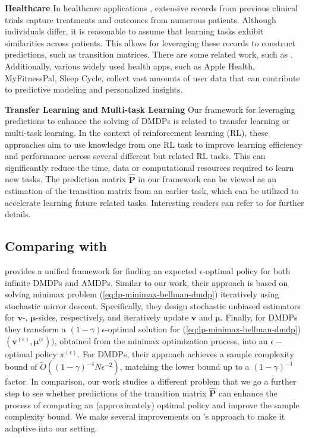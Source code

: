 \documentclass[12pt]{article}
\begin{document}
\textbf{Healthcare} In healthcare applications \cite{yu2021reinforcement}, extensive records from previous clinical trials capture treatments and outcomes from numerous patients. Although individuals differ, it is reasonable to assume that learning tasks exhibit similarities across patients. This allows for leveraging these records to construct predictions, such as transition matrices. There are some related work, such as \cite{chen2022data,mate2022field,liao2020personalized}. Additionally, various widely used health apps, such as Apple Health, MyFitnessPal, Sleep Cycle, collect vast amounts of user data that can contribute to predictive modeling and personalized insights.

\textbf{Transfer Learning and Multi-task Learning} Our framework for leveraging predictions to enhance the solving of DMDPs is related to transfer learning or multi-task learning. In the context of reinforcement learning (RL), these approaches aim to use knowledge from one RL task to improve learning efficiency and performance across several different but related RL tasks. This can significantly reduce the time, data or computational resources required to learn new tasks. The prediction matrix $\hat{\boldsymbol{\text{P}}}$ in our framework can be viewed as an estimation of the transition matrix from an earlier task, which can be utilized to accelerate learning future related tasks. Interesting readers can refer to \cite{taylor2009transfer,zhu2023transfer,hua2021learning,gamrian2019transfer} for further details.

\subsection{Comparing with \cite{jin2020efficiently}}

\label{sec:app-com-sidford-efficient}

\cite{jin2020efficiently} provides a unified framework for finding an expected $\epsilon$-optimal policy for both infinite DMDPs and AMDPs. Similar to our work, their approach is based on solving minimax problem (\ref{eq:lp-minimax-bellman-dmdp}) iteratively using stochastic mirror descent. Specifically, they design stochastic unbiased estimators for $\boldsymbol{v}$-, $\boldsymbol{\mu}$-sides, respectively, and iteratively update $\boldsymbol{v}$ and $\boldsymbol{\mu}$. Finally, for DMDPs they transform a $(1-\gamma) \epsilon$-optimal solution for (\ref{eq:lp-minimax-bellman-dmdp}) $(\boldsymbol{v}^{(\epsilon)},\boldsymbol{\mu}^{(\epsilon}))$, obtained from the minimax optimization process, into an $\epsilon-$optimal policy $\pi^{(\epsilon)}$. For DMDPs, their approach achieves a sample complexity bound of $\tilde{O}((1-\gamma)^{-4}N\epsilon^{-2})$, matching the lower bound up to a $(1-\gamma)^{-1}$ factor. In comparison, our work studies a different problem that we go a further step to see whether predictions of the transition matrix $\hat{\boldsymbol{\text{P}}}$ can enhance the process of computing an (approximately) optimal policy and improve the sample complexity bound. We make several improvements on \cite{jin2020efficiently}'s approach to make it adaptive into our setting. 
\end{document}
